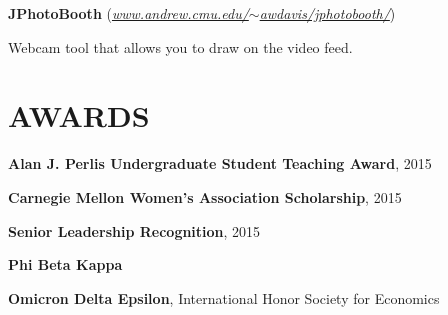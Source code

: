\documentclass[margin, 11pt]{res} %
\begin{document}
\begin{resume}


\vspace{3pt}
{\bf JPhotoBooth} {\small(\href{www.andrew.cmu.edu/~awdavis/jphotobooth/}{\sl www.andrew.cmu.edu/$\sim$awdavis/jphotobooth/})}
\begin{itemize} \itemsep -2pt
{\small \item Webcam tool that allows you to draw on the video feed.}
\end{itemize}



\section{AWARDS}

{\bf Alan J. Perlis Undergraduate Student Teaching Award}, 2015

\vspace{6pt}

{\bf Carnegie Mellon Women's Association Scholarship}, 2015

\vspace{6pt}

{\bf Senior Leadership Recognition}, 2015

\vspace{6pt}



{\bf Phi Beta Kappa}

\vspace{6pt}

{\bf Omicron Delta Epsilon}, International Honor Society for Economics


\end{resume}
\end{document}
